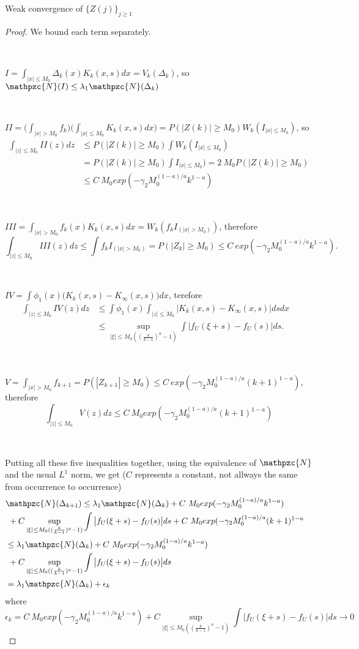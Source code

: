 \documentclass[12pt]{article}
\begin{document}
\begin{section}{Weak convergence of $\{Z(j)\}_{j \ge 1}$ }
\begin{proof}
We bound each term separately.  

\  

$I = \int_{|x| \le M_0} \Delta_k(x) K_k(x,s) dx = V_k( \Delta_k)$, so $\mathpzc{N}(I) \le \lambda_1 \mathpzc{N}(\Delta_k)$  

\  

$II = \big( \int_{|x| > M_0} f_{k} \big) \big( \int_{|x| \le M_0} K_k(x,s) dx \big) = P(|Z(k)| \ge M_0) W_k( I_{|x| \le M_0})$, so 
\begin{align*}
\int_{|z| \le M_0} II(z) dz &\le P(|Z(k)| \ge M_0) \int W_k( I_{|x| \le M_0}) &\\
&= P(|Z(k)| \ge M_0) \int I_{|x| \le M_0}) = 2\ M_0 P(|Z(k)| \ge M_0) &\\
&\le C\ M_0 exp( - \gamma_2 M_0^{(1-a)/a} k^{1-a} ) &
\end{align*}  

\  

$III = \int_{|x| > M_0} f_k(x)  K_k(x,s) dx = W_k( f_k I_{(|x| > M_0) } )$, therefore
$$
\int_{|z| \le M_0} III(z) dz \le \int  f_k I_{(|x| > M_0)} = P(|Z_k| \ge M_0) 
\le C\ exp( - \gamma_2 M_0^{(1-a)/a} k^{1-a} ).
$$  

\  

$IV = \int \phi_1(x) \big( K_k(x,s) - K_{\infty}(x,s) \big) dx $, terefore
\begin{align*}
\int_{|z| \le M_0} IV(z) dz  &\le  \int \phi_1(x) \int_{|z| \le M_0} \big| K_k(x,s) - K_{\infty}(x,s) \big| ds dx &\\
&\le \sup_{|\xi| \le M_0 ( (\frac{k}{k-1})^a -1)} 
\int \big| f_U(\xi+s) - f_U(s) \big| ds. &
\end{align*}  

\  

$V = \int_{|x| > M_0} f_{k+1} = P(|Z_{k+1}| \ge M_0) 
\le C\ exp( - \gamma_2 M_0^{(1-a)/a} (k+1)^{1-a} )$, therefore
$$
\int_{|z| \le M_0} V(z) dz \le C\ M_0 exp( - \gamma_2 M_0^{(1-a)/a} (k+1)^{1-a} )
$$  

\  

Putting all these five inequalities together, using the equivalence of $\mathpzc{N}$ and the usual $L^1$ norm, we get ($C$ represents a constant, not allways the same from occurrence to occurrence)
$$
\begin{aligned}
&\mathpzc{N}(\Delta_{k+1}) \le \lambda_1 \mathpzc{N}(\Delta_k) + C\ M_0 exp( - \gamma_2 M_0^{(1-a)/a} k^{1-a} ) &\\
&\  + C \sup_{|\xi| \le M_0 ( (\frac{k}{k-1})^a -1)} \int \big| f_U(\xi+s) - f_U(s) \big| ds  
+ C\ M_0 exp( - \gamma_2 M_0^{(1-a)/a} (k+1)^{1-a} &\\
& \le \lambda_1 \mathpzc{N}(\Delta_k) + C\ M_0 exp( - \gamma_2 M_0^{(1-a)/a} k^{1-a} ) &\\
&\  + C \sup_{|\xi| \le M_0 ( (\frac{k}{k-1})^a -1)} \int \big| f_U(\xi+s) - f_U(s) \big| ds  &\\
& = \lambda_1 \mathpzc{N}(\Delta_k) + \epsilon_k &
\end{aligned}  
$$  
where 
$$\epsilon_k = C\ M_0 exp( - \gamma_2 M_0^{(1-a)/a} k^{1-a} )
  + C \sup_{|\xi| \le M_0 ( (\frac{k}{k-1})^a -1)} \int \big| f_U(\xi+s) - f_U(s) \big| ds \rightarrow 0
 $$  


\end{proof}
\end{section}
\end{document}
